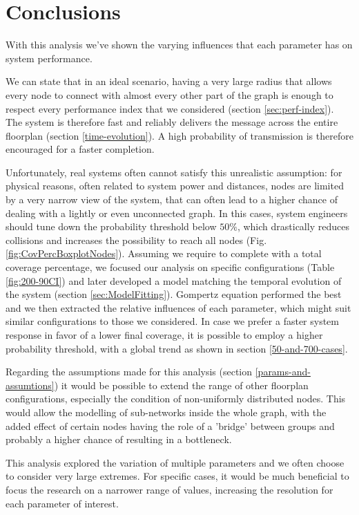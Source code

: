 \section{Conclusions}
With this analysis we've shown the varying influences that each parameter has on system performance. 

We can state that in an ideal scenario, having a very large radius that allows every node to connect with almost every other part of the graph is  enough to respect every performance index that we considered (section \ref{sec:perf-index}). The system is therefore fast and reliably delivers the message across the entire floorplan (section \ref{time-evolution}). A high probability of transmission is therefore encouraged for a faster completion.

Unfortunately, real systems often cannot satisfy this unrealistic assumption: for physical reasons, often related to system power and distances, nodes are limited by a very narrow view of the system, that can often lead to a higher chance of dealing with a lightly or even unconnected graph. In this cases, system engineers should tune down the probability threshold below $50\%$, which drastically reduces collisions and increases the possibility to reach all nodes (Fig. \ref{fig:CovPercBoxplotNodes}). Assuming we require to complete with a total coverage percentage, we focused our analysis on specific configurations (Table \ref{fig:200-90CI}) and later developed a model matching the temporal evolution of the system (section \ref{sec:ModelFitting}). Gompertz equation performed the best and we then extracted the relative influences of each parameter, which might suit similar configurations to those we considered. In case we prefer a faster system response in favor of a lower final coverage, it is possible to employ a higher probability threshold, with a global trend as shown in section \ref{50-and-700-cases}.

Regarding the assumptions made for this analysis (section \ref{params-and-assumtions}) it would be possible to extend the range of other floorplan configurations, especially the condition of non-uniformly distributed nodes. This would allow the modelling of sub-networks inside the whole graph, with the added effect of certain nodes having the role of a 'bridge' between groups and probably a higher chance of resulting in a bottleneck.

This analysis explored the variation of multiple parameters and we often choose to consider very large extremes. For specific cases, it would be much beneficial to focus the research on a narrower range of values, increasing the resolution for each parameter of interest.